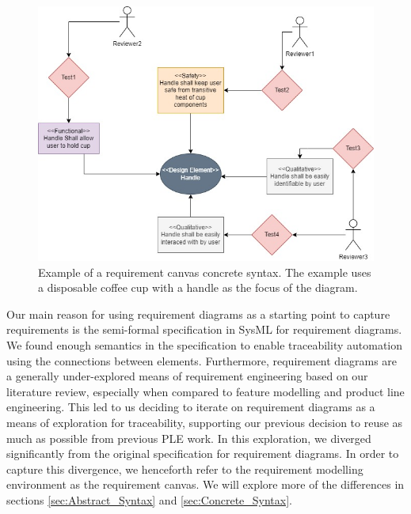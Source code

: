 \begin{figure}[hbt!]
	\centering
	\includegraphics[width=\columnwidth]{Figures/CoffeCup_ReqModel.jpg}
	\caption{Example of a requirement canvas concrete syntax. The example uses a disposable coffee cup with a handle as the focus of the diagram.}
	\label{fig:CoffeCup_ReqModel}
\end{figure}

Our main reason for using requirement diagrams as a starting point to capture requirements is the semi-formal specification in SysML for requirement diagrams. We found enough semantics in the specification to enable traceability automation using the connections between elements. Furthermore, requirement diagrams are a generally under-explored means of requirement engineering based on our literature review, especially when compared to feature modelling and product line engineering. This led to us deciding to iterate on requirement diagrams as a means of exploration for traceability, supporting our previous decision to reuse as much as possible from previous \ac{PLE} work. In this exploration, we diverged significantly from the original specification for requirement diagrams. In order to capture this divergence, we henceforth refer to the requirement modelling environment as the requirement canvas. We will explore more of the differences in sections \ref{sec:Abstract_Syntax} and \ref{sec:Concrete_Syntax}.

